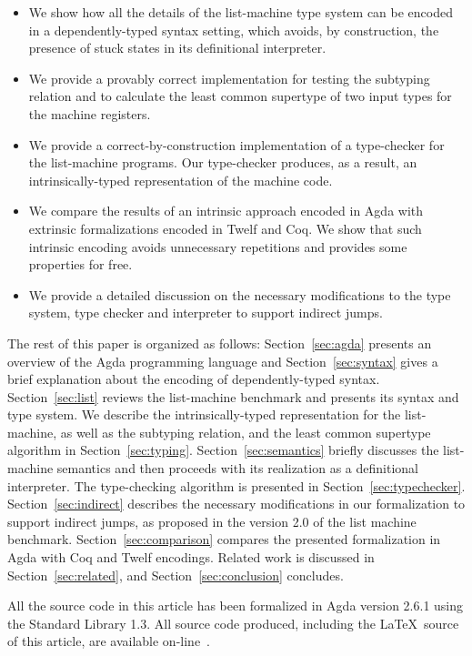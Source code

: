 \documentclass[review]{elsarticle}
\theoremstyle{definition}
\begin{document}
\begin{itemize}
  \item We show how all the details of the list-machine type system
        can be encoded in a dependently-typed syntax setting, which avoids, by construction,
        the presence of stuck states in its definitional interpreter.
  \item We provide a provably correct implementation for testing the subtyping
        relation and to calculate the least common supertype of two input
        types for the machine registers.
  \item We provide a correct-by-construction implementation of a type-checker for the
        list-machine programs. Our type-checker produces, as a result, an intrinsically-typed
        representation of the machine code.
  \item We compare the results of an intrinsic approach encoded in Agda with extrinsic
        formalizations encoded in Twelf and Coq. We show that such intrinsic encoding avoids
        unnecessary repetitions and provides some properties for free.
  \item We provide a detailed discussion on the necessary modifications to the type system,
        type checker and interpreter to support indirect jumps.
\end{itemize}

The rest of this paper is organized as follows: Section~\ref{sec:agda} presents an overview of
the Agda programming language and Section~\ref{sec:syntax}
gives a brief explanation about the encoding of dependently-typed syntax. Section~\ref{sec:list}
reviews the list-machine benchmark and presents its syntax and type system.
We describe the intrinsically-typed representation for the list-machine, as well as
the subtyping relation, and the least common supertype algorithm in Section~\ref{sec:typing}.
Section~\ref{sec:semantics} briefly discusses the list-machine semantics and
then proceeds with its realization as a definitional interpreter.
The type-checking algorithm is presented in Section~\ref{sec:typechecker}.
Section~\ref{sec:indirect} describes the necessary modifications in our formalization to
support indirect jumps, as proposed in the version 2.0 of the list machine benchmark.
Section~\ref{sec:comparison}
compares the presented formalization in Agda with Coq and Twelf encodings. Related work is
discussed in Section~\ref{sec:related}, and Section~\ref{sec:conclusion} concludes.

All the source code in this article has been formalized in Agda
version 2.6.1 using the Standard Library 1.3. All source code produced,
including the \LaTeX~source of this article, are available
on-line~\cite{list-rep}.
\end{document}
